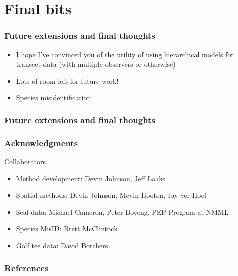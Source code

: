 \documentclass[serif,mathserif]{beamer}
\begin{document}
\section{Final bits}
\begin{frame}
    \frametitle{Future extensions and final thoughts}
    \begin{itemize}
      \item I hope I've convinced you of the utility of using hierarchical models for
      transect data (with multiple observers or otherwise)
      \item Lots of room left for future work!
      \item Species misidentification
    \end{itemize}
\end{frame}

\begin{frame}
    \frametitle{Future extensions and final thoughts}
\end{frame}

\begin{frame}
  \frametitle{Acknowledgments}
  \begin{block}{Collaborators}
    \begin{itemize}
        \item Method development: Devin Johnson, Jeff Laake
        \item Spatial methods: Devin Johnson, Mevin Hooten, Jay ver Hoef
        \item Seal data: Michael Cameron, Peter Boveng, PEP Program at NMML
        \item Species MisID: Brett McClintock
        \item Golf tee data: David Borchers
    \end{itemize}
  \end{block}
\end{frame}

\begin{frame}
\end{frame}

\begin{frame}
  \frametitle{References}
  \tiny
  
  
\end{frame}
\end{document}
